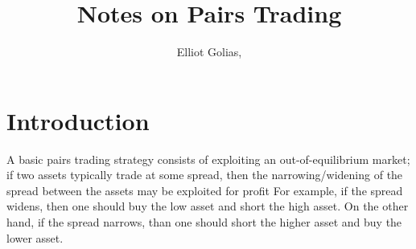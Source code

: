 \documentclass[a4paper,11pt]{article}
\title{\boldmath Notes on Pairs Trading}
\author{Elliot Golias,\note{Corresponding author.}}
\affiliation[a]{Case Western Reserve University,\\some-street, Country}
\begin{document}
 
\maketitle
\flushbottom

\section{Introduction}
\label{sec:intro}

A basic pairs trading strategy consists of exploiting an out-of-equilibrium market; if two assets typically trade at some spread, then the narrowing/widening of the spread between the assets may be exploited for profit
For example, if the spread widens, then one should buy the low asset and short the high asset. On the other hand, if the spread narrows, than one should short the higher asset and buy the lower asset. 
\end{document}
